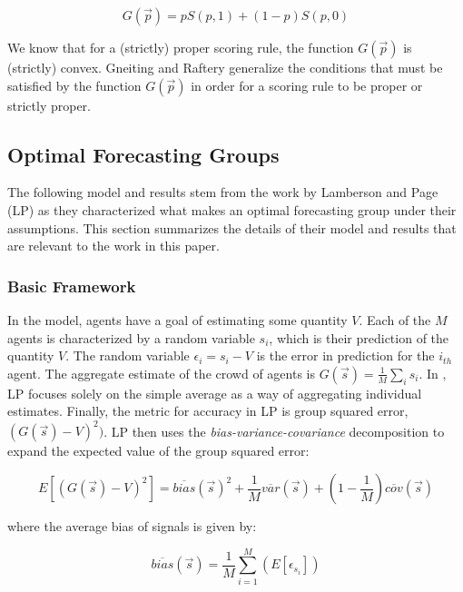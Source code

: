 \documentclass[twoside,twocolumn]{article}
\begin{document}
\begin{equation}
\label{gfunction}
G(\vec{p}) = pS(p,1) + (1-p)S(p,0)
\end{equation}

We know that for a (strictly) proper scoring rule, the function $G(\vec{p})$ is (strictly) convex. Gneiting and Raftery \cite{4} generalize the conditions that must be satisfied by the function $G(\vec{p})$ in order for a scoring rule to be proper or strictly proper.

\subsection{Optimal Forecasting Groups}

The following model and results stem from the work by Lamberson and Page (LP) \cite{3} as they characterized what makes an optimal forecasting group under their assumptions. This section summarizes the details of their model and results that are relevant to the work in this paper.\\
\newline
\subsubsection{Basic Framework}
In the model, agents have a goal of estimating some quantity $V$. Each of the $M$ agents is characterized by a random variable $s_i$, which is their prediction of the quantity $V$. The random variable $\epsilon_i = s_i - V$ is the error in prediction for the $i_{th}$ agent. The aggregate estimate of the crowd of agents is $G(\vec{s}) = \frac1M \sum_i s_i$. In \cite{3}, LP focuses solely on the simple average as a way of aggregating individual estimates. Finally, the metric for accuracy in LP is group squared error, $(G(\vec{s}) - V)^2)$. LP then uses the \textit{bias-variance-covariance} decomposition to expand the expected value of the group squared error:

\begin{equation}
\label{bvcdecomp}
E[(G(\vec{s}) - V)^2] = \overline{bias}(\vec{s})^2 + \frac1M\overline{var}(\vec{s}) + (1 - \frac1M)\overline{cov}(\vec{s})
\end{equation}

where the average bias of signals is given by:

\begin{equation}
\label{bias}
\overline{bias}(\vec{s}) = \frac1M \sum_{i = 1}^M (E[\epsilon_{s_i}])
\end{equation}
\end{document}
